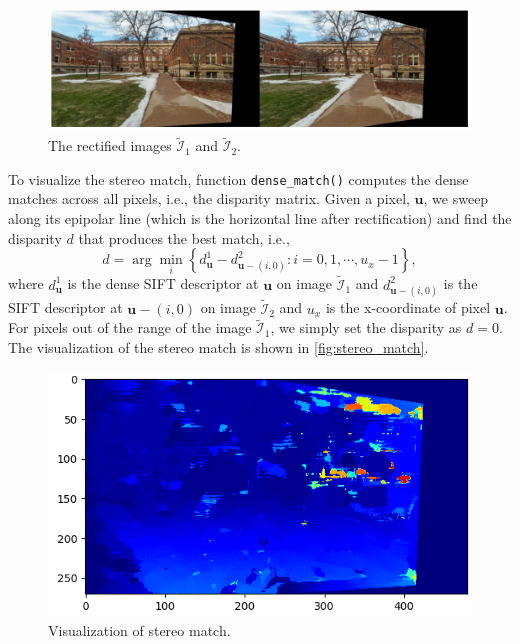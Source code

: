 \documentclass[11pt]{scrartcl}
\begin{document}
\begin{figure}[ht!]
	\begin{center}
		\includegraphics[width=0.8\linewidth]{stereo_rectification.png}
	\end{center}
	\caption{The rectified images $\tilde{\mathcal{I}}_1$ and $\tilde{\mathcal{I}}_2$.}
	\label{fig:stereo_rectification}
\end{figure}

To visualize the stereo match, function \texttt{dense\_match()} computes the dense matches across all pixels, i.e., the disparity matrix. Given a pixel, $\mathbf{u}$, we  sweep along its epipolar line (which is the horizontal line after rectification) and find the disparity $d$ that produces the best match, i.e.,
\begin{equation*}
	d=\arg\min_{i}\left\{
	d_{\mathbf{u}}^1 - d_{\mathbf{u}-(i,0)}^2: i=0,1,\cdots,u_x-1
	\right\},
\end{equation*}
where $d_{\mathbf{u}}^1$ is the dense SIFT descriptor at $\mathbf{u}$ on image $\tilde{\mathcal{I}}_1$ and $d_{\mathbf{u}-(i,0)}^2$ is the SIFT descriptor at $\mathbf{u}-(i,0)$ on image $\tilde{\mathcal{I}}_2$ and $u_x$ is the x-coordinate of pixel $\mathbf{u}$. For pixels out of the range of the image $\tilde{\mathcal{I}}_1$, we simply set the disparity as $d=0$. The visualization of the stereo match is shown in \autoref{fig:stereo_match}.

\begin{figure}[ht!]
	\begin{center}
		\includegraphics[width=0.6\linewidth]{stereo_match.png}
	\end{center}
	\caption{Visualization of stereo match.}
	\label{fig:stereo_match}
\end{figure}















\nocite*{}  


\end{document}
